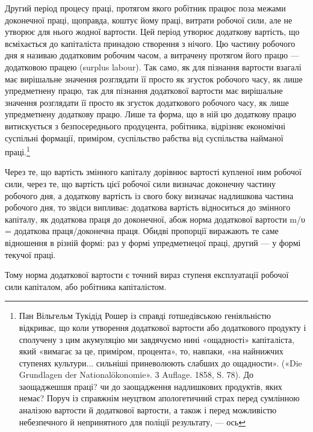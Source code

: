 Другий період процесу праці, протягом якого робітник працює поза межами доконечної праці, щоправда,
коштує йому
праці, витрати робочої сили, але не утворює для нього жодної вартости. Цей період утворює додаткову
вартість, що всміхається до капіталіста принадою створення з нічого. Цю частину робочого
дня я називаю додатковим робочим часом, а витрачену протягом його працю — додатковою працею (surplus
labour). Так само, як для пізнання вартости взагалі має вирішальне значення розглядати її просто як
згусток робочого часу, як лише упредметнену працю, так для пізнання додаткової вартости має
вирішальне
значення розглядати її просто як згусток додаткового робочого часу, як лише упредметнену додаткову
працю. Лише та форма, що в ній цю додаткову працю витискується з безпосереднього продуцента,
робітника, відрізняє економічні суспільні формації, приміром, суспільство рабства від суспільства
найманої праці.\footnote{
Пан Вільгельм Тукідід Рошер із справді ґотшедівською геніяльністю відкриває, що коли утворення
додаткової вартости або додаткового продукту і сполучену з цим акумуляцію ми завдячуємо нині
«ощадності» капіталіста, який «вимагає за це, приміром, процента», то, навпаки, «на
найнижчих ступенях культури... сильніші приневолюють слабших до ощадности». («Die Grundlagen der
Nationalökonomie». 3 Auflage. 1858, S. 78). До заощаджешшя праці? чи до заощадження надлишкових
продуктів, яких немає? Поруч із справжнім неуцтвом апологетичний страх перед сумлінною аналізою
вартости й додаткової вартости, а також і перед можливістю небезпечного й непринятного для поліції
результату, — ось
}

Через те, що вартість змінного капіталу дорівнює вартості купленої ним робочої сили, через те, що
вартість цієї робочої
сили визначає доконечну частину робочого дня, а додаткову вартість із свого боку визначає надлишкова
частина робочого дня, то звідси випливає: додаткова вартість відноситься до змінного капіталу, як
додаткова праця до доконечної, абож норма додаткової вартости m/υ = додаткова праця/доконечна праця.
Обидві пропорції виражають те саме відношення в різній формі: раз у формі упредметнецої
праці, другий — у формі текучої праці.

Тому норма додаткової вартости є точний вираз ступеня експлуатації робочої сили капіталом, або
робітника капіталістом.


